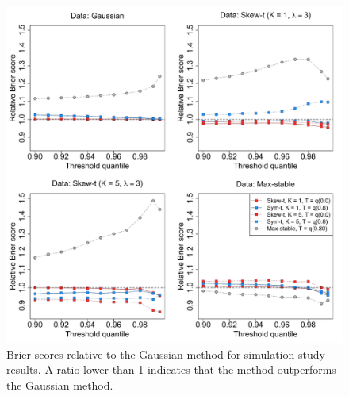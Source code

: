 \documentclass[11pt]{article}
\begin{document}
\begin{figure}
  \includegraphics[width=\linewidth]{plots/bsplots-mean.pdf}
  \caption{Brier scores relative to the Gaussian method for simulation study results. A ratio lower than 1 indicates that the method outperforms the Gaussian method.}
  \label{fig:simbrierscores}
\end{figure}
\end{document}
